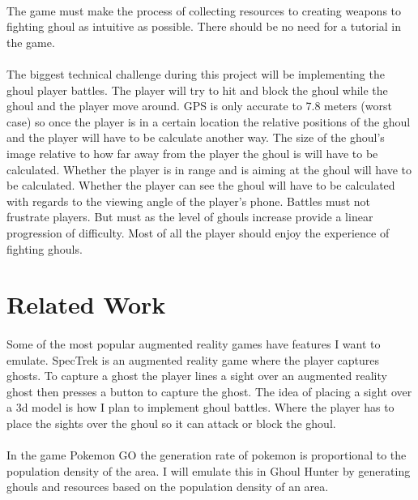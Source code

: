 \documentclass{article}
\begin{document}
	\paragraph{}The game must make the process of collecting resources to creating weapons to fighting ghoul as intuitive as possible. There should be no need for a tutorial in the game. 
	
	\paragraph{}The biggest technical challenge during this project will be implementing the ghoul player battles. The player will try to hit and block the ghoul while the ghoul and the player move around. GPS is only accurate to 7.8 meters (worst case) \cite{GPSACCURACY} so once the player is in a certain location the relative positions of the ghoul and the player will have to be calculate another way. The size of the ghoul's image relative to how far away from the player the ghoul is will have to be calculated. Whether the player is in range and is aiming at the ghoul will have to be calculated. Whether the player can see the ghoul will have to be calculated with regards to the viewing angle of the player's phone. Battles must not frustrate players. But must as the level of ghouls increase provide a linear progression of difficulty. Most of all the player should enjoy the experience of fighting ghouls.  
	
	\section{Related Work}
	\paragraph{}Some of the most popular augmented reality games have features I want to emulate. SpecTrek \cite{SpecTrek} is an augmented reality game where the player captures ghosts. To capture a ghost the player lines a sight over an augmented reality ghost then presses a button to capture the ghost. The idea of placing a sight over a 3d model is how I plan to implement ghoul battles. Where the player has to place the sights over the ghoul so it can attack or block the ghoul.  
	
	\paragraph{}In the game Pokemon GO the generation rate of pokemon is proportional to the population density of the area. I will emulate this in Ghoul Hunter by generating ghouls and resources based on the population density of an area. 
	
\end{document}
